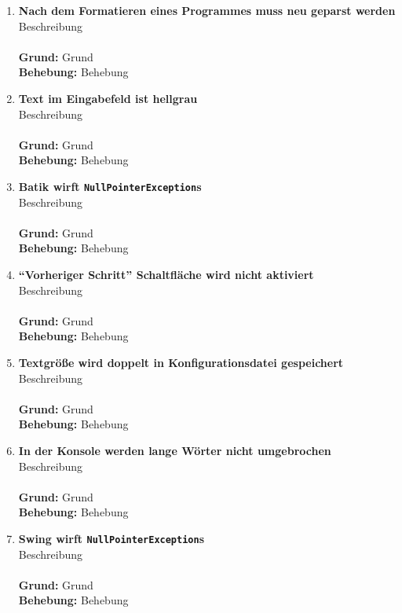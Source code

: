 \documentclass[parskip=full,11pt,twoside]{scrartcl}
\begin{document}
\begin{enumerate}[label=\#\arabic*]
  \item \textbf{Nach dem Formatieren eines Programmes muss neu geparst werden}\\
        Beschreibung\\\\
        \textbf{Grund:} Grund\\
        \textbf{Behebung:} Behebung

  \item \textbf{Text im Eingabefeld ist hellgrau}\\
        Beschreibung\\\\
        \textbf{Grund:} Grund\\
        \textbf{Behebung:} Behebung

  \item \textbf{Batik wirft \texttt{NullPointerException}s}\\
        Beschreibung\\\\
        \textbf{Grund:} Grund\\
        \textbf{Behebung:} Behebung

  \item \textbf{\enquote{Vorheriger Schritt} Schaltfläche wird nicht aktiviert}\\
        Beschreibung\\\\
        \textbf{Grund:} Grund\\
        \textbf{Behebung:} Behebung

  \item \textbf{Textgröße wird doppelt in Konfigurationsdatei gespeichert}\\
        Beschreibung\\\\
        \textbf{Grund:} Grund\\
        \textbf{Behebung:} Behebung

  \item \textbf{In der Konsole werden lange Wörter nicht umgebrochen}\\
        Beschreibung\\\\
        \textbf{Grund:} Grund\\
        \textbf{Behebung:} Behebung

  \item \textbf{Swing wirft \texttt{NullPointerException}s}\\
        Beschreibung\\\\
        \textbf{Grund:} Grund\\
        \textbf{Behebung:} Behebung


\end{enumerate}
\end{document}

